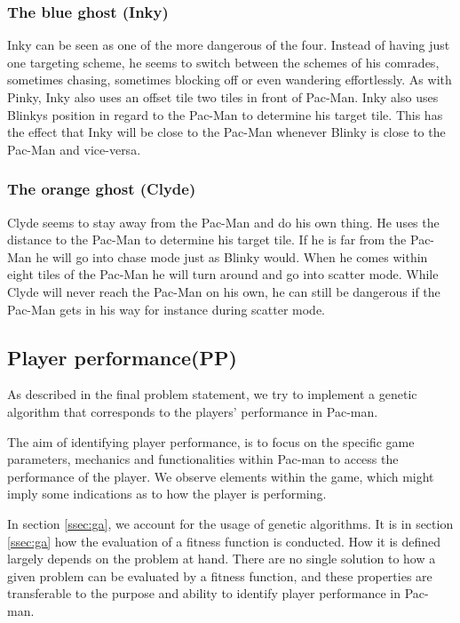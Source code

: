 \subsubsection*{The blue ghost (Inky)}
Inky can be seen as one of the more dangerous of the four. Instead of having just one targeting scheme, he seems to switch between the schemes of his comrades, sometimes chasing, sometimes blocking off or even wandering effortlessly. As with Pinky, Inky also uses an offset tile two tiles in front of Pac-Man. Inky also uses Blinkys position in regard to the Pac-Man to determine his target tile. This has the effect that Inky will be close to the Pac-Man whenever Blinky is close to the Pac-Man and vice-versa.

\subsubsection*{The orange ghost (Clyde)}
Clyde seems to stay away from the Pac-Man and do his own thing. He uses the distance to the Pac-Man to determine his target tile. If he is far from the Pac-Man he will go into chase mode just as Blinky would. When he comes within eight tiles of the Pac-Man he will turn around and go into scatter mode. While Clyde will never reach the Pac-Man on his own, he can still be dangerous if the Pac-Man gets in his way for instance during scatter mode.


\subsection{Player performance(PP)}\label{ssec:player-performance}

As described in the final problem statement, we try to implement a genetic algorithm that corresponds to the players' performance in Pac-man.


The aim of identifying player performance, is to focus on the specific game parameters, mechanics and functionalities within Pac-man to access the performance of the player. We observe elements within the game, which might imply some indications as to how the player is performing.

In section \ref{ssec:ga}, we account for the usage of genetic algorithms. It is in section \ref{ssec:ga} how the evaluation of a fitness function is conducted. How it is defined largely depends on the problem at hand. There are no single solution to how a given problem can be evaluated by a fitness function, and these properties are transferable to the purpose and ability to identify player performance in Pac-man.

